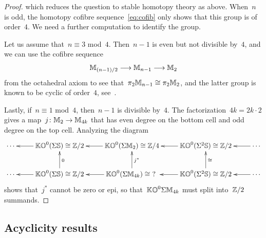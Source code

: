 \begin{proof}
which reduces the question to stable homotopy theory as above. 
When~$n$ is odd, the homotopy cofibre sequence~\eqref{eq:cofib} only shows that this group is of order~$4$. We need a further computation to identify the group. 

Let us assume that~$n\equiv 3$ mod~$4$. Then~$n-1$ is even but not divisible by~$4$, and we can use the cofibre sequence 
\[
\mathbb{M}_{(n-1)/2}\longrightarrow
\mathbb{M}_{n-1}\longrightarrow
\mathbb{M}_2
\]
from the octahedral axiom to see that~$\pi_2\mathbb{M}_{n-1}\cong\pi_2\mathbb{M}_2$, and the latter group is known to be cyclic of order~$4$, see~\cite[Thm.~3.2]{Mukai}.


Lastly, if~$n\equiv 1$ mod~$4$, then~$n-1$ is divisible by~$4$. The factorization~$4k=2k\cdot 2$ gives a map~$j\colon\mathbb{M}_2\to\mathbb{M}_{4k}$ that has even degree on the bottom cell and odd degree on the top cell. Analyzing the diagram
\[
\xymatrix{
\cdots&\KO^0(\Sigma\bbS)\cong \bbZ/2\ar[l]&\KO^0(\Sigma\bbM_2)\cong \bbZ/4\ar[l]&\KO^0(\Sigma^2\bbS)\cong \bbZ/2\ar[l]&\cdots\ar[l]\\
\cdots&\KO^0(\Sigma\bbS) \cong \bbZ/2\ar[l]\ar[u]_0&\KO^0(\Sigma\bbM_{4k})\cong \ ?\ \ar[l]\ar[u]_{j^*}&\KO^0(\Sigma^2\bbS) \cong \bbZ/2\ar[l]\ar[u]_\cong&\cdots\ar[l]\\
}
\]
shows that~$j^*$ cannot be zero or epi, so that~$\mathbb{KO}^0\Sigma\mathbb{M}_{4k}$ must split into~$\mathbb{Z}/2$ summands. 
\end{proof}


\subsection{Acyclicity results}

